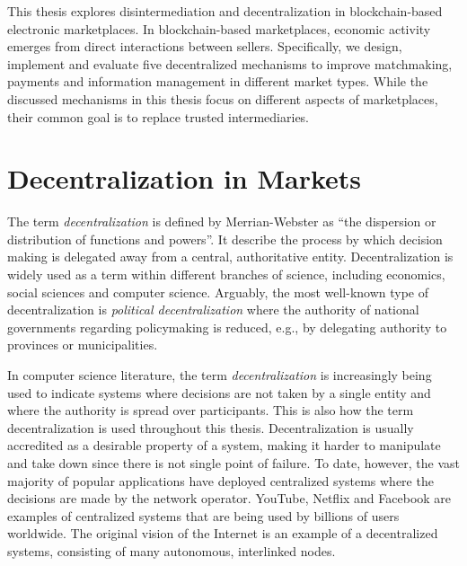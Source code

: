 This thesis explores disintermediation and decentralization in blockchain-based electronic marketplaces.
In blockchain-based marketplaces, economic activity emerges from direct interactions between sellers.
Specifically, we design, implement and evaluate five decentralized mechanisms to improve matchmaking, payments and information management in different market types.
While the discussed mechanisms in this thesis focus on different aspects of marketplaces, their common goal is to replace trusted intermediaries. 

\section{Decentralization in Markets}
The term \emph{decentralization} is defined by Merrian-Webster as \enquote{the dispersion or distribution of functions and powers}.
It describe the process by which decision making is delegated away from a central, authoritative entity.
Decentralization is widely used as a term within different branches of science, including economics, social sciences and computer science.
Arguably, the most well-known type of decentralization is \emph{political decentralization} where the authority of national governments regarding policymaking is reduced, e.g., by delegating authority to provinces or municipalities.

In computer science literature, the term \emph{decentralization} is increasingly being used to indicate systems where decisions are not taken by a single entity and where the authority is spread over participants.
This is also how the term decentralization is used throughout this thesis.
Decentralization is usually accredited as a desirable property of a system, making it harder to manipulate and take down since there is not single point of failure.
To date, however, the vast majority of popular applications have deployed centralized systems where the decisions are made by the network operator.
YouTube, Netflix and Facebook are examples of centralized systems that are being used by billions of users worldwide.
The original vision of the Internet is an example of a decentralized systems, consisting of many autonomous, interlinked nodes.

